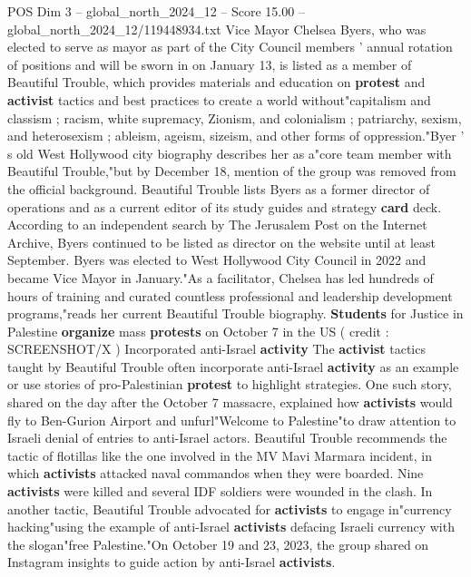 \begin{textsample}{POS Dim 3 – global\_north\_2024\_12 – Score 15.00 – global\_north\_2024\_12/119448934.txt}  \label{ex:f3_pos_216}
Vice Mayor Chelsea Byers, who was elected to serve as mayor as part of the City Council members ' annual rotation of positions and will be sworn in on January 13, is listed as a member of Beautiful Trouble, which provides materials and education on \textbf{protest} and \textbf{activist} tactics and best practices to create a world without"capitalism and classism ; racism, white supremacy, Zionism, and colonialism ; patriarchy, sexism, and heterosexism ; ableism, ageism, sizeism, and other forms of oppression."Byer ' s old West Hollywood city biography describes her as a"core team member with Beautiful Trouble,"but by December 18, mention of the group was removed from the official background.
Beautiful Trouble lists Byers as a former director of operations and as a current editor of its study guides and strategy \textbf{card} deck.
According to an independent search by The Jerusalem Post on the Internet Archive, Byers continued to be listed as director on the website until at least September.
Byers was elected to West Hollywood City Council in 2022 and became Vice Mayor in January."As a facilitator, Chelsea has led hundreds of hours of training and curated countless professional and leadership development programs,"reads her current Beautiful Trouble biography. \textbf{Students} for Justice in Palestine \textbf{organize} mass \textbf{protests} on October 7 in the US ( credit : SCREENSHOT/X ) Incorporated anti-Israel \textbf{activity} The \textbf{activist} tactics taught by Beautiful Trouble often incorporate anti-Israel \textbf{activity} as an example or use stories of pro-Palestinian \textbf{protest} to highlight strategies.
One such story, shared on the day after the October 7 massacre, explained how \textbf{activists} would fly to Ben-Gurion Airport and unfurl"Welcome to Palestine"to draw attention to Israeli denial of entries to anti-Israel actors.
Beautiful Trouble recommends the tactic of flotillas like the one involved in the MV Mavi Marmara incident, in which \textbf{activists} attacked naval commandos when they were boarded.
Nine \textbf{activists} were killed and several IDF soldiers were wounded in the clash.
In another tactic, Beautiful Trouble advocated for \textbf{activists} to engage in"currency hacking"using the example of anti-Israel \textbf{activists} defacing Israeli currency with the slogan"free Palestine."On October 19 and 23, 2023, the group shared on Instagram insights to guide action by anti-Israel \textbf{activists}.

\end{textsample}
